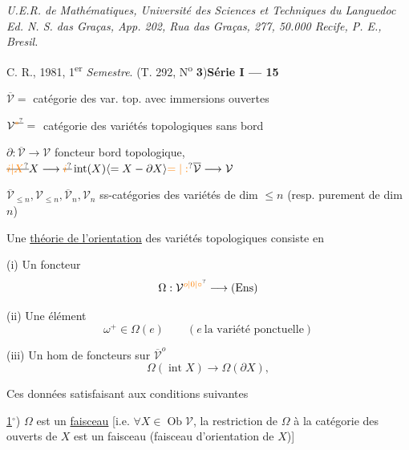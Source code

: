 \textit{U.E.R. de Mathématiques, Université des Sciences et Techniques du Languedoc}\\
\textit{Ed. N. S. das Graças, App. 202, Rua das Graças, 277, 50.000 Recife, P. E., Bresil.}

C. R., 1981, 1\textsuperscript{er} \textit{Semestre}. (T. 292, N\textsuperscript{o} \textbf{3})\hfill\textbf{Série I --- 15}

$\overline{\mathcal V}={}$ catégorie des var. top.  avec immersions ouvertes

$\mathcal V^{\deleted{\unsure{*}}}={}$ catégorie des variétés topologiques sans bord

$\partial:\overline{\mathcal V}\longrightarrow\mathcal V$ foncteur bord topologique, $\deleted{\unsure{i|X}}X\longrightarrow\deleted{\unsure{i}}\operatorname{int}(X)\inserted{=X-\partial X}\unsure{=|:}\overline{\mathcal V}\longrightarrow\mathcal V$ 

$\overline{\mathcal V}_{\leq n},\mathcal V_{\leq n},\overline{\mathcal V}_n,\mathcal V_n$ ss-catégories des variétés de dim $\leq n$ (resp. purement de dim $n$)

Une \uline{théorie de l'orientation} des variétés topologiques consiste en

(i) Un foncteur
\[
\Omega:\mathcal V^{\unsure{o|0|\circ}}\longrightarrow(\mathrm{Ens})
\]

(ii) Une  élément 
\[
\omega^+\in\Omega(e)\qquad(e\ \text{la variété ponctuelle})
\]

(iii)  Un hom de foncteurs sur $\overline{\mathcal V}^{o}$
\[
\Omega(\operatorname{int}X)\longrightarrow\Omega(\partial X),
\]

Ces données satisfaisant aux conditions suivantes

\uline{1}$^\circ$) $\Omega$ est un \uline{faisceau} [i.e. $\forall X\in\operatorname{Ob}\mathcal V$, la restriction  de $\Omega$ à la catégorie des ouverts de $X$ est un faisceau \unsure{$\}$} (faisceau d'orientation de $X$)]

